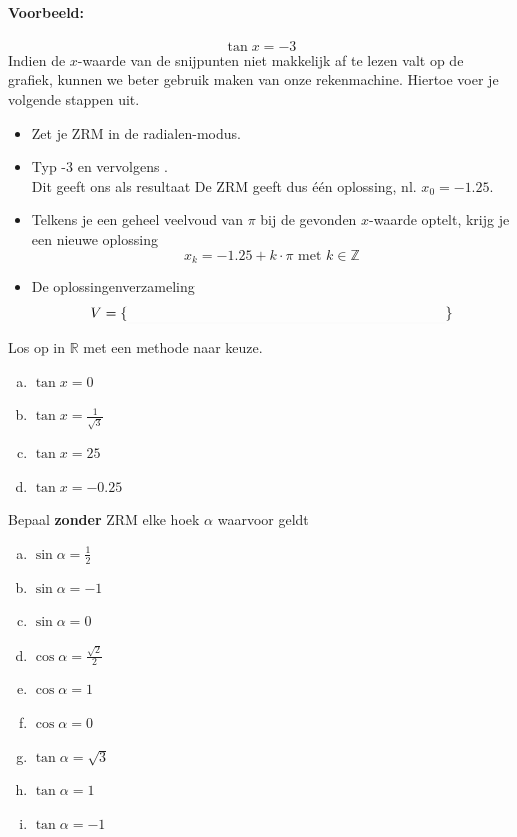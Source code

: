 \documentclass[a4paper,12pt,twoside]{article}
\begin{document}
\paragraph*{Voorbeeld:}
$$\tan x = -3$$
Indien de $x$-waarde van de snijpunten niet makkelijk af te lezen valt op de grafiek, kunnen we beter gebruik maken van onze rekenmachine.
Hiertoe voer je volgende stappen uit.
\begin{itemize}
  \item Zet je ZRM in de radialen-modus.
  \item Typ -3 en vervolgens  .\\
  Dit geeft ons als resultaat \arulefill
  De ZRM geeft dus één oplossing, nl. $x_{0}=-1.25$.
  \item Telkens je een geheel veelvoud van $\pi$ bij de gevonden $x$-waarde optelt, krijg je een nieuwe oplossing
  $$x_k=-1.25+k\cdot\pi \mbox{ met } k \in \mathbb{Z}$$
  \item De oplossingenverzameling
  $$V = \{\arule{8cm}\}$$
\end{itemize}

\begin{oefening}
Los op in $\mathbb{R}$ met een methode naar keuze.
\begin{enumerate}[(a)]
  \item $\tan x=0$
  \item $\tan x=\frac{1}{\sqrt{3}}$
  \item $\tan x=25$
  \item $\tan x=-0.25$
\end{enumerate}
\end{oefening}

\begin{oefening}
Bepaal \textbf{zonder} ZRM elke hoek $\alpha$ waarvoor geldt
\begin{enumerate}[(a)]
  \item $\sin\alpha=\frac{1}{2}$
  \item $\sin\alpha=-1$
  \item $\sin\alpha=0$
  \item $\cos\alpha=\frac{\sqrt{2}}{2}$
  \item $\cos\alpha=1$
  \item $\cos\alpha=0$
  \item $\tan\alpha=\sqrt{3}$
  \item $\tan\alpha=1$
  \item $\tan\alpha=-1$
\end{enumerate}
\end{oefening}
\end{document}
